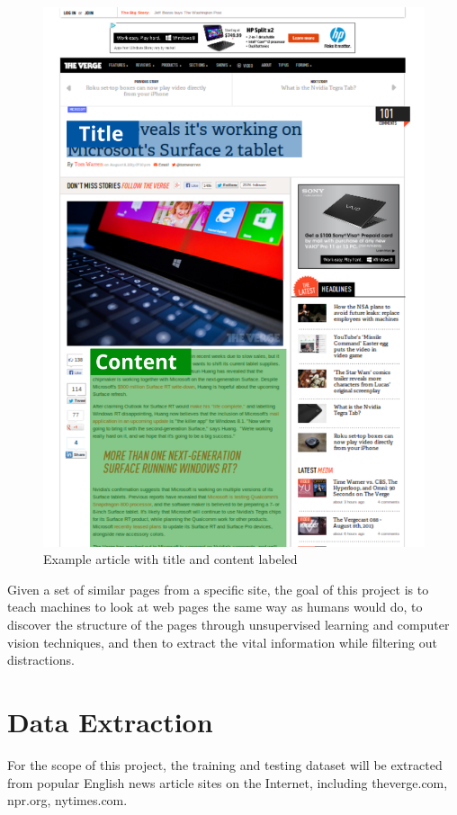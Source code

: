 \documentclass[a4paper,10pt]{article}
\begin{document}
\begin{figure}[htp]
\centering
\includegraphics[scale=0.65]{theverge_labeled}
\caption{Example article with title and content labeled}
\label{}
\end{figure}

Given a set of similar pages from a specific site, the goal of this project is to teach machines to look at web pages the same way as humans would do, to discover the structure of the pages through unsupervised learning and computer vision techniques, and then to extract the vital information while filtering out distractions.


\section{Data Extraction}

For the scope of this project, the training and testing dataset will be extracted from popular English news article sites on the Internet, including theverge.com, npr.org, nytimes.com.
\end{document}
